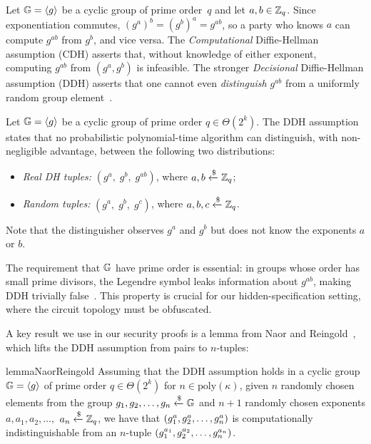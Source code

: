 Let $\mathbb{G} = \left\langle g \right\rangle$ be a cyclic group of prime order~$q$ and let $a,b \in \mathbb{Z}_q$. Since exponentiation commutes, $(g^a)^b = (g^b)^a = g^{ab}$, so a party who knows $a$ can compute $g^{ab}$ from $g^b$, and vice versa. The \emph{Computational} Diffie-Hellman assumption (CDH) asserts that, without knowledge of either exponent, computing $g^{ab}$ from $(g^a, g^b)$ is infeasible. The stronger \emph{Decisional} Diffie-Hellman assumption (DDH) asserts that one cannot even \emph{distinguish} $g^{ab}$ from a uniformly random group element~\cite{Bon98}.

\begin{assumption}\label{assumption:DDH}
    Let $\mathbb{G} = \left\langle g \right\rangle$ be a cyclic group of prime order $q\in \Theta(2^k)$. The DDH assumption states that no probabilistic polynomial-time algorithm can distinguish, with non-negligible advantage, between the following two distributions:
    \begin{itemize}
        \item \emph{Real DH tuples:} $(g^a,\; g^b,\; g^{ab})$, where $a,b \xleftarrow{\$} \mathbb{Z}_q$;
        \item \emph{Random tuples:} $(g^a,\; g^b,\; g^{c})$, where $a,b,c \xleftarrow{\$} \mathbb{Z}_q$.
    \end{itemize}
    Note that the distinguisher observes $g^a$ and $g^b$ but does not know the exponents $a$ or $b$.
\end{assumption}

The requirement that $\mathbb{G}$ have prime order is essential: in groups whose order has small prime divisors, the Legendre symbol leaks information about $g^{ab}$, making DDH trivially false~\cite[Section~1.1]{Bon98}. This property is crucial for our hidden-specification setting, where the circuit topology must be obfuscated.

A key result we use in our security proofs is a lemma from Naor and Reingold~\cite{NR04}, which lifts the DDH assumption from pairs to $n$-tuples:

\begin{restatable}{lemma}{NaorReingold}\label{lemma:DDHprop}
     Assuming that the DDH assumption holds in a cyclic group $\mathbb{G} = \left\langle g \right\rangle$ of prime order $q\in \Theta(2^k)$  for $n\in \mathrm{poly}(\kappa)$, given $n$ randomly chosen elements from the group $g_1,g_2,\dots,g_n\xleftarrow{\$}\mathbb{G}$ and $n+1$ randomly chosen exponents $a,a_1,a_2,\dots,$ $a_n\xleftarrow{\$}\mathbb{Z}_q$,  we have that $\left( g_1^{a},g_2^{a},\dots,g_n^{a} \right)$ is computationally indistinguishable from an $n$-tuple $\left( g_1^{a_1},g_2^{a_2},\dots,g_n^{a_n} \right)$.
\end{restatable}

